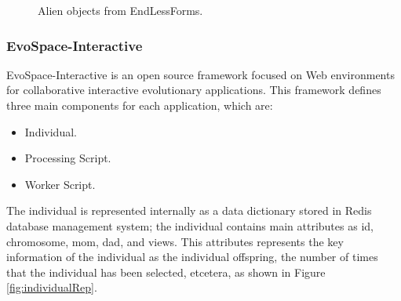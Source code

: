 \begin{figure}
\captionsetup{justification=centering,margin=2cm}
\centering
\setlength\fboxsep{0pt}
\setlength\fboxrule{0.7pt}
\caption{Alien objects from EndLessForms.}
\label{fig:EndlessForms}
\end{figure}

\subsubsection{EvoSpace-Interactive} EvoSpace-Interactive is an open source
framework focused on Web environments for collaborative interactive evolutionary
applications. This framework defines three main components for each application,
which are:
\begin{itemize}
	\item Individual.
	\item Processing Script.
	\item Worker Script.
\end{itemize}

The individual is represented internally as a data dictionary stored in Redis
\cite{redis} database management system; the individual contains main attributes as id,
chromosome, mom, dad, and views. This attributes represents the key information
of the individual as the individual offspring, the number of times that the
individual has been selected, etcetera, as shown in Figure \ref{fig:individualRep}.

